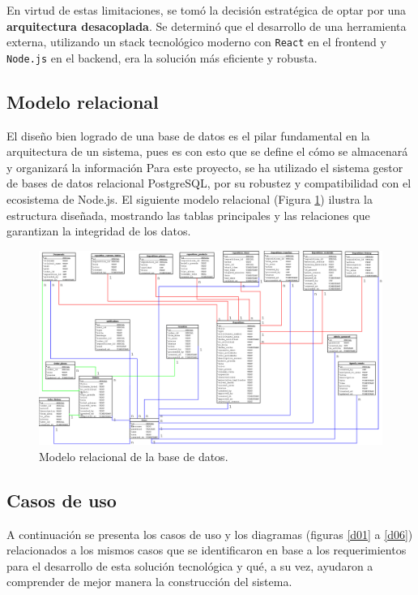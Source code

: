 \documentclass[12pt,letterpaper,spanish]{report}
\begin{document}
En virtud de estas limitaciones, se tomó la decisión estratégica de optar por una \textbf{arquitectura desacoplada}. Se determinó que el desarrollo de una herramienta externa, utilizando un stack tecnológico moderno con \texttt{React} en el frontend y \texttt{Node.js} en el backend, era la solución más eficiente y robusta. 




\subsection{Modelo relacional}
El diseño bien logrado de una base de datos es el pilar fundamental en la arquitectura de un sistema, pues es con esto que se define el cómo se almacenará y organizará la información Para este proyecto, se ha utilizado el sistema gestor de bases de datos relacional PostgreSQL, por su robustez y compatibilidad con el ecosistema de Node.js. El siguiente modelo relacional (Figura \ref{ER}) ilustra la estructura diseñada, mostrando las tablas principales y las relaciones que garantizan la integridad de los datos.
\begin{figure}[H]
  \centering
  \includegraphics[width=1\textwidth]{Diagrama1.png}
  \caption{Modelo relacional de la base de datos.}\label{ER}
\end{figure} 
 
 \subsection{Casos de uso}
A continuación se presenta los casos de uso y los diagramas (figuras \ref{d01} a \ref{d06}) relacionados a los mismos casos que se identificaron en base a los requerimientos para el desarrollo de esta solución tecnológica y qué, a su vez, ayudaron a comprender de mejor manera la construcción del sistema. 
\end{document}
